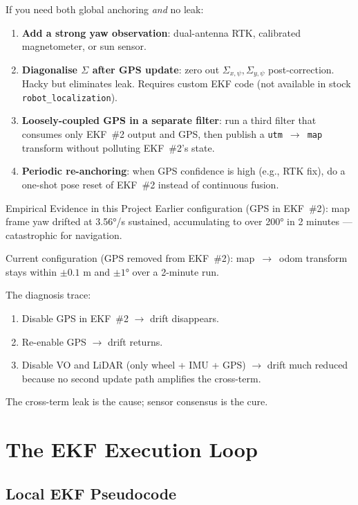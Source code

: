\documentclass[11pt,a4paper]{article}
\begin{document}
If you need both global anchoring \emph{and} no leak:
\begin{enumerate}
\item \textbf{Add a strong yaw observation}: dual-antenna RTK, calibrated magnetometer, or sun sensor.
\item \textbf{Diagonalise $\Sigma$ after GPS update}: zero out $\Sigma_{x,\psi}, \Sigma_{y,\psi}$ post-correction. Hacky but eliminates leak. Requires custom EKF code (not available in stock \texttt{robot\_localization}).
\item \textbf{Loosely-coupled GPS in a separate filter}: run a third filter that consumes only EKF~\#2 output and GPS, then publish a \texttt{utm}~$\to$~\texttt{map} transform without polluting EKF~\#2's state.
\item \textbf{Periodic re-anchoring}: when GPS confidence is high (e.g., RTK fix), do a one-shot pose reset of EKF~\#2 instead of continuous fusion.
\end{enumerate}

\begin{insightbox}{Empirical Evidence in this Project}
Earlier configuration (GPS in EKF~\#2): map frame yaw drifted at 3.56°/s sustained, accumulating to over 200° in 2 minutes --- catastrophic for navigation.

Current configuration (GPS removed from EKF~\#2): map~$\to$~odom transform stays within $\pm 0.1$ m and $\pm 1°$ over a 2-minute run.

The diagnosis trace:
\begin{enumerate}
\item Disable GPS in EKF~\#2 $\to$ drift disappears.
\item Re-enable GPS $\to$ drift returns.
\item Disable VO and LiDAR (only wheel + IMU + GPS) $\to$ drift much reduced because no second update path amplifies the cross-term.
\end{enumerate}
The cross-term leak is the cause; sensor consensus is the cure.
\end{insightbox}

\section{The EKF Execution Loop}

\subsection{Local EKF Pseudocode}
\end{document}

